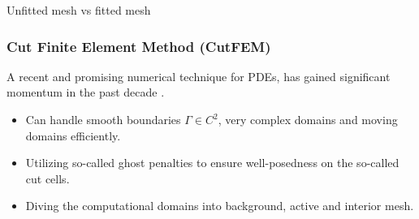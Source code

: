 \begin{frame}
\begin{block}{Unfitted mesh vs fitted mesh}
\begin{figure}
\begin{minipage}{0.45\textwidth}
    \end{minipage}


    \label{fig:domain_mesh}
    \end{figure}
\end{block}

\end{frame}


\begin{frame}
\frametitle{Cut Finite Element Method (CutFEM)}

A recent and promising numerical technique for PDEs, has gained significant momentum in the past decade \footnotemark[1]\footnotemark[2].

\begin{block}{}
    \begin{itemize}
        \item  Can handle smooth boundaries $\Gamma \in C^2 $, very complex domains and moving domains efficiently.
        \item Utilizing so-called ghost penalties to ensure well-posedness on the so-called cut cells.
        \item Diving the computational domains into background, active and interior mesh.
    \end{itemize}
\end{block}

\end{frame}

